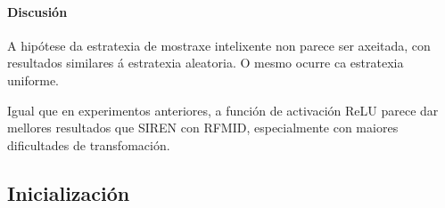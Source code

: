 




\FloatBarrier

\paragraph{Discusión}
\label{par:Discusion-sampling}

A hipótese da estratexia de mostraxe intelixente non parece ser axeitada, con resultados similares á estratexia aleatoria. 
O mesmo ocurre ca estratexia uniforme.

Igual que en experimentos anteriores, a función de activación ReLU parece dar mellores resultados que SIREN con RFMID, especialmente con maiores dificultades de transfomación.


\subsection{Inicialización}
\label{subsec:Inicialización}

